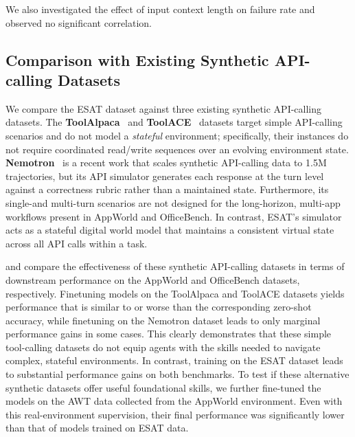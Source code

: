 We also investigated the effect of input context length on failure rate and observed no significant correlation.



\subsection{Comparison with Existing Synthetic API-calling Datasets}
We compare the \textsc{ESAT} dataset against three existing synthetic API-calling datasets. The \textbf{ToolAlpaca}~\citep{toolalpaca} and \textbf{ToolACE}~\citep{toolace} datasets target simple API-calling scenarios and do not model a \emph{stateful} environment; specifically, their instances do not require coordinated read/write sequences over an evolving environment state. \textbf{Nemotron}~\citep{chandiramani2026nemotron} is a recent work that scales synthetic API-calling data to 1.5M trajectories, but its API simulator generates each response at the turn level against a correctness rubric rather than a maintained state. Furthermore, its single-and multi-turn scenarios are not designed for the long-horizon, multi-app workflows present in AppWorld and OfficeBench. In contrast, \textsc{ESAT}'s simulator acts as a stateful digital world model that maintains a consistent virtual state across all API calls within a task.


 and  compare the effectiveness of these synthetic API-calling datasets in terms of downstream performance on the AppWorld and OfficeBench datasets, respectively. Finetuning models on the ToolAlpaca and ToolACE datasets yields performance that is similar to or worse than the corresponding zero-shot accuracy, while finetuning on the Nemotron dataset leads to only marginal performance gains in some cases. This clearly demonstrates that these simple tool-calling datasets do not equip agents with the skills needed to navigate complex, stateful environments. In contrast, training on the ESAT dataset leads to substantial performance gains on both benchmarks. To test if these alternative synthetic datasets offer useful foundational skills, we further fine-tuned the models on the AWT data collected from the AppWorld environment. Even with this real-environment supervision, their final performance was significantly lower than that of models trained on ESAT data.



